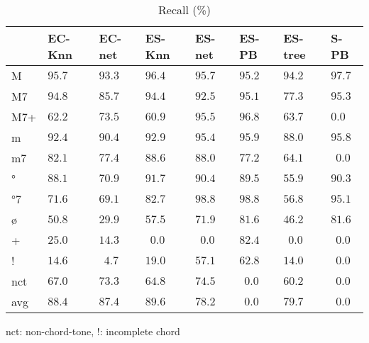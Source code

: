\documentclass{article}
\begin{document}
\begin{table}
  \centering
  \begin{tabular}{l|p{.5cm}p{.5cm}p{.5cm}p{.5cm}p{.5cm}p{.5cm}p{.5cm}}

   &EC-Knn&EC-net &ES-Knn &ES-net &ES-PB  &ES-tree&S-PB   \\
\hline                                            
M  &$95.7$&$ 93.3$&$ 96.4$&$95.7 $&$ 95.2$&$ 94.2$&$ \mathbf{97.7}$ \\
M7 &$94.8$&$ 85.7$&$ 94.4$&$92.5 $&$ 95.1$&$ 77.3$&$ \mathbf{95.3}$ \\
M7+&$62.2$&$ 73.5$&$ 60.9$&$95.5 $&$ \mathbf{96.8}$&$ 63.7$&$  0.0$ \\
m  &$92.4$&$ 90.4$&$ 92.9$&$95.4 $&$ \mathbf{95.9}$&$ 88.0$&$ 95.8$ \\
m7 &$82.1$&$ 77.4$&$ \mathbf{88.6}$&$88.0 $&$ 77.2$&$ 64.1$&$~~0.0$ \\
°  &$88.1$&$ 70.9$&$ \mathbf{91.7}$&$90.4 $&$ 89.5$&$ 55.9$&$ 90.3$ \\
°7 &$71.6$&$ 69.1$&$ 82.7$&$\mathbf{98.8} $&$ \mathbf{98.8}$&$ 56.8$&$ 95.1$ \\
ø  &$50.8$&$ 29.9$&$ 57.5$&$71.9 $&$ \mathbf{81.6}$&$ 46.2$&$ \mathbf{81.6}$ \\
+  &$25.0$&$ 14.3$&$~~0.0$&$~~0.0$&$ \mathbf{82.4}$&$~~0.0$&$~~0.0$ \\
!  &$14.6$&$~~4.7$&$ 19.0$&$57.1 $&$ \mathbf{62.8}$&$ 14.0$&$~~0.0$ \\
nct&$67.0$&$ 73.3$&$ 64.8$&$\mathbf{74.5} $&$~~0.0$&$ 60.2$&$~~0.0$ \\
avg&$\mathbf{88.4}$&$ 87.4$&$ 89.6$&$78.2 $&$~~0.0$&$ 79.7$&$~~0.0$ \\
  \end{tabular}                                                        

\medskip

nct: non-chord-tone, !: incomplete chord
  \caption{Recall (\%)}
  \label{tab:recall}
\end{table}
\end{document}
